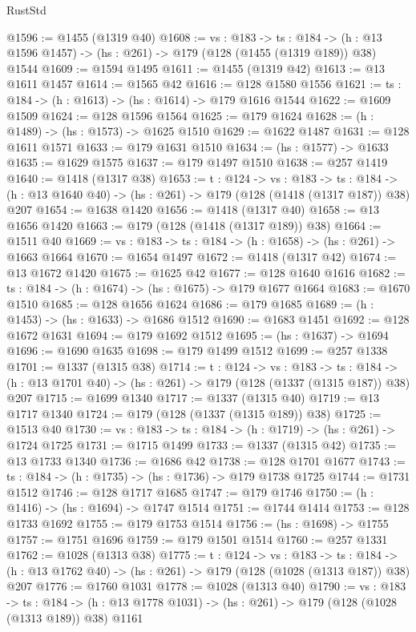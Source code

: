 \begin{lexlean}{RustStd}
\begin{coremodule}
{\begin{coremodule}
{{{{{@1596 := @1455 (@1319 @40)
@1608 := {vs : @183} ->
  {ts : @184} -> (h : @13 @1596 @1457) -> (hs : @261) -> @179 (@128 (@1455 (@1319 @189)) @38) @1544
@1609 := @1594 @1495
@1611 := @1455 (@1319 @42)
@1613 := @13 @1611 @1457
@1614 := @1565 @42
@1616 := @128 @1580 @1556
@1621 := {ts : @184} -> (h : @1613) -> (hs : @1614) -> @179 @1616 @1544
@1622 := @1609 @1509
@1624 := @128 @1596 @1564
@1625 := @179 @1624
@1628 := (h : @1489) -> (hs : @1573) -> @1625 @1510
@1629 := @1622 @1487
@1631 := @128 @1611 @1571
@1633 := @179 @1631 @1510
@1634 := (hs : @1577) -> @1633
@1635 := @1629 @1575
@1637 := @179 @1497 @1510
@1638 := @257 @1419
@1640 := @1418 (@1317 @38)
@1653 := {t : @124} ->
  {vs : @183} ->
  {ts : @184} -> (h : @13 @1640 @40) -> (hs : @261) -> @179 (@128 (@1418 (@1317 @187)) @38) @207
@1654 := @1638 @1420
@1656 := @1418 (@1317 @40)
@1658 := @13 @1656 @1420
@1663 := @179 (@128 (@1418 (@1317 @189)) @38)
@1664 := @1511 @40
@1669 := {vs : @183} -> {ts : @184} -> (h : @1658) -> (hs : @261) -> @1663 @1664
@1670 := @1654 @1497
@1672 := @1418 (@1317 @42)
@1674 := @13 @1672 @1420
@1675 := @1625 @42
@1677 := @128 @1640 @1616
@1682 := {ts : @184} -> (h : @1674) -> (hs : @1675) -> @179 @1677 @1664
@1683 := @1670 @1510
@1685 := @128 @1656 @1624
@1686 := @179 @1685
@1689 := (h : @1453) -> (hs : @1633) -> @1686 @1512
@1690 := @1683 @1451
@1692 := @128 @1672 @1631
@1694 := @179 @1692 @1512
@1695 := (hs : @1637) -> @1694
@1696 := @1690 @1635
@1698 := @179 @1499 @1512
@1699 := @257 @1338
@1701 := @1337 (@1315 @38)
@1714 := {t : @124} ->
  {vs : @183} ->
  {ts : @184} -> (h : @13 @1701 @40) -> (hs : @261) -> @179 (@128 (@1337 (@1315 @187)) @38) @207
@1715 := @1699 @1340
@1717 := @1337 (@1315 @40)
@1719 := @13 @1717 @1340
@1724 := @179 (@128 (@1337 (@1315 @189)) @38)
@1725 := @1513 @40
@1730 := {vs : @183} -> {ts : @184} -> (h : @1719) -> (hs : @261) -> @1724 @1725
@1731 := @1715 @1499
@1733 := @1337 (@1315 @42)
@1735 := @13 @1733 @1340
@1736 := @1686 @42
@1738 := @128 @1701 @1677
@1743 := {ts : @184} -> (h : @1735) -> (hs : @1736) -> @179 @1738 @1725
@1744 := @1731 @1512
@1746 := @128 @1717 @1685
@1747 := @179 @1746
@1750 := (h : @1416) -> (hs : @1694) -> @1747 @1514
@1751 := @1744 @1414
@1753 := @128 @1733 @1692
@1755 := @179 @1753 @1514
@1756 := (hs : @1698) -> @1755
@1757 := @1751 @1696
@1759 := @179 @1501 @1514
@1760 := @257 @1331
@1762 := @1028 (@1313 @38)
@1775 := {t : @124} ->
  {vs : @183} ->
  {ts : @184} -> (h : @13 @1762 @40) -> (hs : @261) -> @179 (@128 (@1028 (@1313 @187)) @38) @207
@1776 := @1760 @1031
@1778 := @1028 (@1313 @40)
@1790 := {vs : @183} ->
  {ts : @184} -> (h : @13 @1778 @1031) -> (hs : @261) -> @179 (@128 (@1028 (@1313 @189)) @38) @1161
}}}}}
\end{coremodule}}
\end{coremodule}
\end{lexlean}
